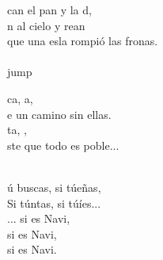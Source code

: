 \begin{cancion}
	can el pan y la d, \\
	n al cielo y rean \\
	que una esla rompió las fronas. \\
	\jump\\jump\\
	\begin{chorus}%
	ca, a, \\
	e un camino sin ellas. \\
	ta, , \\
	ste que todo es poble... \\
	\end{chorus}%
	\jump\\
	ú buscas, si túeñas,  \\
	Si túntas, si túíes... \\
	... si es Navi,  \\
	si es Navi,  \\
	si es Navi.\\
\end{cancion}%
